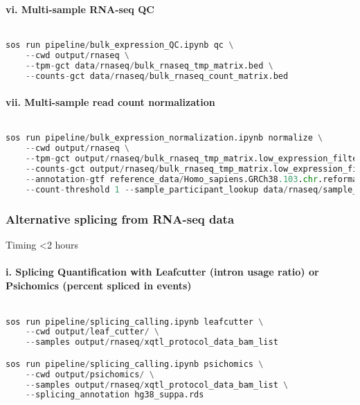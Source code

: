 \documentclass[12pt]{article}
\begin{document}
\paragraph*{vi. Multi-sample RNA-seq QC}


\noindent
\begin{lstlisting}[language=Python]

sos run pipeline/bulk_expression_QC.ipynb qc \
    --cwd output/rnaseq \
    --tpm-gct data/rnaseq/bulk_rnaseq_tmp_matrix.bed \
    --counts-gct data/rnaseq/bulk_rnaseq_count_matrix.bed

\end{lstlisting}




\paragraph*{vii. Multi-sample read count normalization}


\noindent
\begin{lstlisting}[language=Python]

sos run pipeline/bulk_expression_normalization.ipynb normalize \
    --cwd output/rnaseq \
    --tpm-gct output/rnaseq/bulk_rnaseq_tmp_matrix.low_expression_filtered.outlier_removed.tpm.gct.gz \
    --counts-gct output/rnaseq/bulk_rnaseq_tmp_matrix.low_expression_filtered.outlier_removed.geneCount.gct.gz \
    --annotation-gtf reference_data/Homo_sapiens.GRCh38.103.chr.reformatted.collapse_only.gene.ERCC.gtf  \
    --count-threshold 1 --sample_participant_lookup data/rnaseq/sample_participant_lookup.txt

\end{lstlisting}




\subsubsection*{Alternative splicing from RNA-seq data}
Timing <2 hours

\paragraph*{i. Splicing Quantification with Leafcutter (intron usage ratio) or Psichomics (percent spliced in events)}


\noindent
\begin{lstlisting}[language=Python]

sos run pipeline/splicing_calling.ipynb leafcutter \
    --cwd output/leaf_cutter/ \
    --samples output/rnaseq/xqtl_protocol_data_bam_list 

sos run pipeline/splicing_calling.ipynb psichomics \
    --cwd output/psichomics/ \
    --samples output/rnaseq/xqtl_protocol_data_bam_list \
    --splicing_annotation hg38_suppa.rds

\end{lstlisting}
\end{document}
